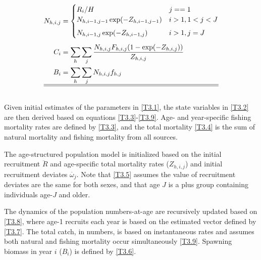 \begin{table}
\begin{align}
        N_{h,i,j} &= \begin{cases}
            R_i / H & j ==1 \\
            N_{h,i-1,j-1} \exp(-Z_{h,i-1,j-1})   & i>1, 1< j < J\\[1ex]
            N_{h,i-1,j} \exp(-Z_{h,i-1,j}) & i>1, j=J
        \end{cases}                                                     \label{T3.8} \\[1ex]
        C_i &= \sum_h \sum_j \dfrac{N_{h,i,j}F_{h,i,j}(1-\exp(-Z_{h,i,j}))}
        {Z_{h,i,j}}                                                     \label{T3.9} \\
        B_i &= \sum_h \sum_j N_{h,i,j} f_{h,j}                          \label{T3.6} \\
        \hline \hline \nonumber
    \end{align}
    \normalEq
    \end{table}

Given initial estimates of the parameters in \eqref{T3.1}, the state variables in \eqref{T3.2} are then derived  based on equations \ref{T3.3}-\ref{T3.9}.  Age- and year-specific fishing mortality rates are defined by \eqref{T3.3}, and the total mortality \eqref{T3.4} is the sum of natural mortality and fishing mortality from all sources.

The age-structured population model is initialized based on the initial recruitment $\ddot{R}$ and age-specific total mortality rates ($Z_{h,i,j}$) and initial recruitment deviates $\ddot{\omega_j}$.  Note that \eqref{T3.5} assumes the value of recruitment deviates are the same for both sexes, and that age $J$ is a plus group containing individuals age-$J$ and older.

The dynamics of the population numbers-at-age are recursively updated based on \eqref{T3.8}, where age-1 recruits each year is based on the estimated vector defined by \eqref{T3.7}. The total catch, in numbers, is based on instantaneous rates and assumes both natural and fishing mortality occur simultaneously \eqref{T3.9}. Spawning biomass in year $i$ ($B_i$) is defined by \eqref{T3.6}.






